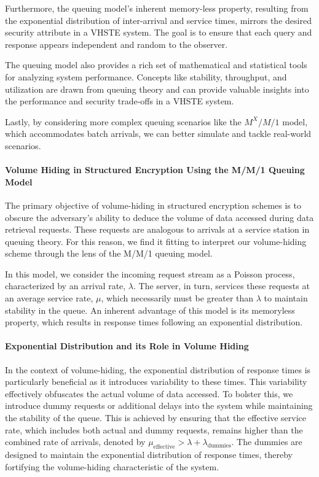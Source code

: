 \documentclass{article}
\begin{document}
Furthermore, the queuing model's inherent memory-less property, resulting from the exponential distribution of inter-arrival and service times, mirrors the desired security attribute in a VHSTE system. The goal is to ensure that each query and response appears independent and random to the observer.

The queuing model also provides a rich set of mathematical and statistical tools for analyzing system performance. Concepts like stability, throughput, and utilization are drawn from queuing theory and can provide valuable insights into the performance and security trade-offs in a VHSTE system.

Lastly, by considering more complex queuing scenarios like the $M^X/M/1$ model, which accommodates batch arrivals, we can better simulate and tackle real-world scenarios.
\paragraph{Volume Hiding in Structured Encryption Using the M/M/1 Queuing Model}

The primary objective of volume-hiding in structured encryption schemes is to obscure the adversary's ability to deduce the volume of data accessed during data retrieval requests. These requests are analogous to arrivals at a service station in queuing theory. For this reason, we find it fitting to interpret our volume-hiding scheme through the lens of the M/M/1 queuing model.

In this model, we consider the incoming request stream as a Poisson process, characterized by an arrival rate, $\lambda$. The server, in turn, services these requests at an average service rate, $\mu$, which necessarily must be greater than $\lambda$ to maintain stability in the queue. An inherent advantage of this model is its memoryless property, which results in response times following an exponential distribution.

\paragraph{Exponential Distribution and its Role in Volume Hiding}

In the context of volume-hiding, the exponential distribution of response times is particularly beneficial as it introduces variability to these times. This variability effectively obfuscates the actual volume of data accessed. To bolster this, we introduce dummy requests or additional delays into the system while maintaining the stability of the queue. This is achieved by ensuring that the effective service rate, which includes both actual and dummy requests, remains higher than the combined rate of arrivals, denoted by $\mu_{\text{effective}} > \lambda + \lambda_{\text{dummies}}$. The dummies are designed to maintain the exponential distribution of response times, thereby fortifying the volume-hiding characteristic of the system.
\end{document}
